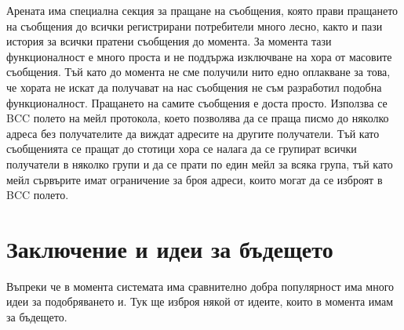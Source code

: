 \documentclass[a4paper,12pt]{article}
\begin{document}
  Арената има специална секция за пращане на съобщения, която прави пращането на съобщения до всички регистрирани потребители много лесно, както и пази история за всички пратени съобщения до момента. За момента тази функционалност е много проста и не поддържа изключване на хора от масовите съобщения. Тъй като до момента не сме получили нито едно оплакване за това, че хората не искат да получават на нас съобщения не съм разработил подобна функционалност. Пращането на самите съобщения е доста просто. Използва се BCC полето на мейл протокола, което позволява да се праща писмо до няколко адреса без получателите да виждат адресите на другите получатели. Тъй като съобщенията се пращат до стотици хора се налага да се групират всички получатели в няколко групи и да се прати по един мейл за всяка група, тъй като мейл сървърите имат ограничение за броя адреси, които могат да се изброят в BCC полето.
  
  \section{Заключение и идеи за бъдещето}
    Въпреки че в момента системата има сравнително добра популярност има много идеи за подобряването и. Тук ще изброя някой от идеите, които в момента имам за бъдещето.
    
\end{document}
